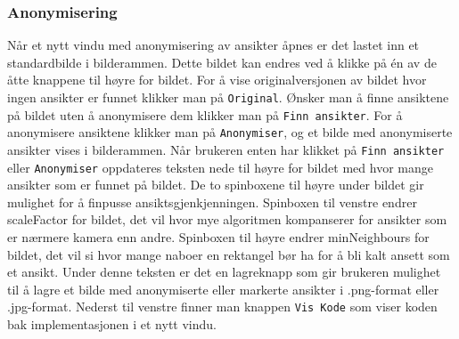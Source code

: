 \subsubsection{Anonymisering}
Når et nytt vindu med anonymisering av ansikter åpnes er det lastet inn et standardbilde i bilderammen. Dette bildet kan endres ved å klikke på én av de åtte knappene til høyre for bildet. For å vise originalversjonen av bildet hvor ingen ansikter er funnet klikker man på \texttt{Original}. Ønsker man å finne ansiktene på bildet uten å anonymisere dem klikker man på \texttt{Finn ansikter}. For å anonymisere ansiktene klikker man på \texttt{Anonymiser}, og et bilde med anonymiserte ansikter vises i bilderammen. Når brukeren enten har klikket på \texttt{Finn ansikter} eller \texttt{Anonymiser} oppdateres teksten nede til høyre for bildet med hvor mange ansikter som er funnet på bildet. De to spinboxene til høyre under bildet gir mulighet for å finpusse ansiktsgjenkjenningen. Spinboxen til venstre endrer scaleFactor for bildet, det vil hvor mye algoritmen kompanserer for ansikter som er nærmere kamera enn andre. Spinboxen til høyre endrer minNeighbours for bildet, det vil si hvor mange naboer en rektangel bør ha for å bli kalt ansett som et ansikt. Under denne teksten er det en lagreknapp som gir brukeren mulighet til å lagre et bilde med anonymiserte eller markerte ansikter i .png-format eller .jpg-format. Nederst til venstre finner man knappen \texttt{Vis Kode} som viser koden bak implementasjonen i et nytt vindu. 